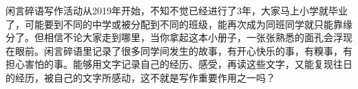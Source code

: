 \markdownRendererDocumentBegin
{}\markdownRendererInterblockSeparator
{}闲言碎语写作活动从2019年开始，不知不觉已经进行了3年，大家马上小学就毕业了，可能要到不同的中学或被分配到不同的班级，能再次成为同班同学就只能靠缘分了。但相信不论大家走到哪里，当你拿起这本小册子，一张张熟悉的面孔会浮现在眼前。闲言碎语里记录了很多同学间发生的故事，有开心快乐的事，有糗事，有担心害怕的事。能够用文字记录自己的经历、感受，再读这些文字，又能复现往日的经历，被自己的文字所感动，这不就是写作重要作用之一吗？\markdownRendererDocumentEnd